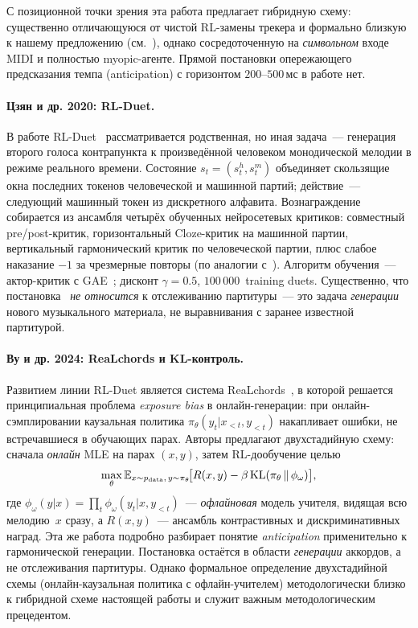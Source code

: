 С позиционной точки зрения эта работа предлагает гибридную
схему: существенно отличающуюся от чистой RL-замены трекера и
формально близкую к нашему предложению (см.~),
однако сосредоточенную на \textit{символьном} входе MIDI и
полностью myopic-агенте. Прямой постановки опережающего
предсказания темпа (anticipation) с горизонтом $200$--$500$\,мс
в работе нет.

\paragraph*{Цзян и др. 2020: RL-Duet.} В работе
RL-Duet~\cite{Jiang2020RLDuet} рассматривается родственная,
но иная задача~--- генерация второго голоса контрапункта
к произведённой человеком монодической мелодии в режиме
реального времени. Состояние $s_t = (s_t^h, s_t^m)$ объединяет
скользящие окна последних токенов человеческой и машинной
партий; действие~--- следующий машинный токен из дискретного
алфавита. Вознаграждение собирается из ансамбля четырёх
обученных нейросетевых критиков: совместный pre/post-критик,
горизонтальный Cloze-критик на машинной партии, вертикальный
гармонический критик по человеческой партии, плюс слабое
наказание $-1$ за чрезмерные повторы (по
аналогии с~\cite{Jaques2017SeqTutor}). Алгоритм обучения~---
актор-критик с GAE~\cite{Schulman2016GAE}; дисконт
$\gamma=0.5$, $100\,000$~training duets. Существенно, что
постановка~\cite{Jiang2020RLDuet} \textit{не относится} к
отслеживанию партитуры~--- это задача \textit{генерации} нового
музыкального материала, не выравнивания с заранее известной
партитурой.

\paragraph*{Ву и др. 2024: ReaLchords и KL-контроль.} Развитием
линии RL-Duet является система ReaLchords~\cite{Wu2024ReaLchords},
в которой решается принципиальная проблема \textit{exposure bias}
в онлайн-генерации: при онлайн-сэмплировании каузальная политика
$\pi_\theta(y_t|x_{<t},y_{<t})$ накапливает ошибки, не
встречавшиеся в обучающих парах. Авторы предлагают двухстадийную
схему: сначала \textit{онлайн} MLE на парах $(x,y)$, затем
RL-дообучение целью~\cite[уравн.~2]{Wu2024ReaLchords}
\begin{equation}
\max_\theta \Expect_{x\sim p_{\text{data}},\,y\sim\pi_\theta}\!\bigl[
R(x,y) - \beta\,\mathrm{KL}(\pi_\theta\,\|\,\phi_\omega)\bigr],
\eqlab{realchords-obj}
\end{equation}
где $\phi_\omega(y|x)=\prod_t\phi_\omega(y_t|x,y_{<t})$~---
\textit{офлайновая} модель учителя, видящая всю мелодию~$x$
сразу, а $R(x,y)$~--- ансамбль контрастивных и дискриминативных
наград. Эта же работа подробно разбирает понятие
\textit{anticipation} применительно к гармонической генерации.
Постановка остаётся в области \textit{генерации} аккордов,
а не отслеживания партитуры. Однако формальное определение
двухстадийной схемы (онлайн-каузальная политика с офлайн-учителем)
методологически близко к гибридной схеме настоящей работы и
служит важным методологическим прецедентом.

